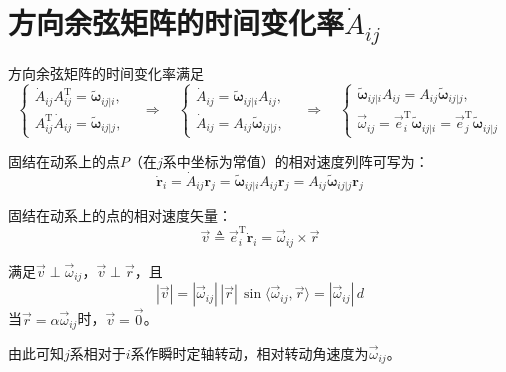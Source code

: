 \section{方向余弦矩阵的时间变化率$\dot{A}_{ij}$}

方向余弦矩阵的时间变化率满足
\begin{equation}
\begin{cases}
\dot{A}_{ij}A_{ij}^{\mathrm{T}} = \tilde{\boldsymbol{\omega}}_{ij|i}, \\[4pt]
A_{ij}^{\mathrm{T}}\dot{A}_{ij} = \tilde{\boldsymbol{\omega}}_{ij|j},
\end{cases}
\quad\Rightarrow\quad
\begin{cases}
\dot{A}_{ij} = \tilde{\boldsymbol{\omega}}_{ij|i}A_{ij}, \\[4pt]
\dot{A}_{ij} = A_{ij}\tilde{\boldsymbol{\omega}}_{ij|j},
\end{cases}
\quad\Rightarrow\quad
\begin{cases}
\tilde{\boldsymbol{\omega}}_{ij|i}A_{ij} = A_{ij}\tilde{\boldsymbol{\omega}}_{ij|j}, \\[4pt]
\vec{\omega}_{ij} = \vec{e}_i^{\mathrm{T}}\tilde{\boldsymbol{\omega}}_{ij|i} = \vec{e}_j^{\mathrm{T}}\tilde{\boldsymbol{\omega}}_{ij|j}
\end{cases}
\label{eq:6.2}
\end{equation}

固结在动系上的点$P$（在$j$系中坐标为常值）的相对速度列阵可写为：
\begin{equation}
\dot{\boldsymbol{r}}_i = \dot{A}_{ij}\boldsymbol{r}_j
= \tilde{\boldsymbol{\omega}}_{ij|i}A_{ij}\boldsymbol{r}_j
= A_{ij}\tilde{\boldsymbol{\omega}}_{ij|j}\boldsymbol{r}_j
\end{equation}

固结在动系上的点的相对速度矢量：
\begin{equation}
\vec{v} \triangleq \vec{e}_i^{\mathrm{T}}\dot{\boldsymbol{r}}_i = \vec{\omega}_{ij} \times \vec{r}
\label{eq:6.3}
\end{equation}

满足$\vec{v} \perp \vec{\omega}_{ij}$，$\vec{v} \perp \vec{r}$，且
\begin{equation}
|\vec{v}| = |\vec{\omega}_{ij}|\,|\vec{r}|\,\sin\langle\vec{\omega}_{ij},\vec{r}\rangle = |\vec{\omega}_{ij}|\,d
\end{equation}
当$\vec{r} = \alpha\vec{\omega}_{ij}$时，$\vec{v} = \vec{0}$。

由此可知$j$系相对于$i$系作瞬时定轴转动，相对转动角速度为$\vec{\omega}_{ij}$。

